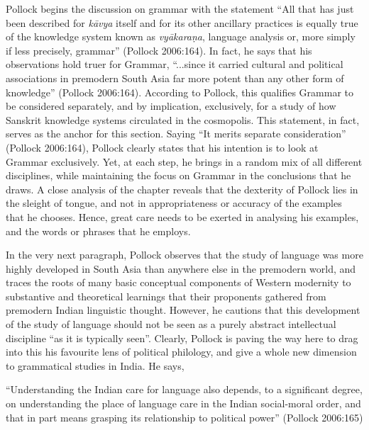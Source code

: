 Pollock begins the discussion on grammar with the statement ``All that has just been described for {\sl kāvya} itself and for its other ancillary practices is equally true of the knowledge system known as {\sl vyākaraṇa}, language analysis or, more simply if less precisely, grammar'' (Pollock 2006:164). In fact, he says that his observations hold truer for Grammar, ``...since it carried cultural and political associations in premodern South Asia far more potent than any other form of knowledge'' (Pollock 2006:164). According to Pollock, this qualifies Grammar to be considered separately, and by implication, exclusively, for a study of how Sanskrit knowledge systems circulated in the cosmopolis. This statement, in fact, serves as the anchor for this section. Saying ``It merits separate consideration'' (Pollock 2006:164), Pollock clearly states that his intention is to look at Grammar exclusively. Yet, at each step, he brings in a random mix of all different disciplines, while maintaining the focus on Grammar in the conclusions that he draws. A close analysis of the chapter reveals that the dexterity of Pollock lies in the sleight of tongue, and not in appropriateness or accuracy of the examples that he chooses. Hence, great care needs to be exerted in analysing his examples, and the words or phrases that he employs.

In the very next paragraph, Pollock observes that the study of language was more highly developed in South Asia than anywhere else in the premodern world, and traces the roots of many basic conceptual components of Western modernity to substantive and theoretical learnings that their proponents gathered from premodern Indian linguistic thought. However, he cautions that this development of the study of language should not be seen as a purely abstract intellectual discipline ``as it is typically seen''. Clearly, Pollock is paving the way here to drag into this his favourite lens of political philology, and give a whole new dimension to grammatical studies in India. He says, 
\begin{myquote}
``Understanding the Indian care for language also depends, to a significant degree, on understanding the place of language care in the Indian social-moral order, and that in part means grasping its relationship to political power'' 
\hfill (Pollock 2006:165)
\end{myquote}

\newpage

